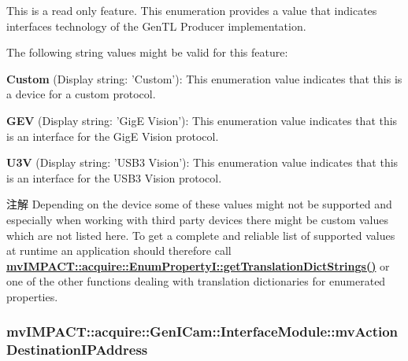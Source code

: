 This is a read only feature. This enumeration provides a value that indicates interfaces technology of the Gen\+T\+L Producer implementation.

The following string values might be valid for this feature\+:
\begin{DoxyItemize}
\item {\bfseries Custom} (Display string\+: 'Custom')\+: This enumeration value indicates that this is a device for a custom protocol.
\item {\bfseries G\+E\+V} (Display string\+: 'Gig\+E Vision')\+: This enumeration value indicates that this is an interface for the Gig\+E Vision protocol.
\item {\bfseries U3\+V} (Display string\+: 'U\+S\+B3 Vision')\+: This enumeration value indicates that this is an interface for the U\+S\+B3 Vision protocol.
\end{DoxyItemize}

\begin{DoxyNote}{注解}
Depending on the device some of these values might not be supported and especially when working with third party devices there might be custom values which are not listed here. To get a complete and reliable list of supported values at runtime an application should therefore call {\bfseries \hyperlink{classmv_i_m_p_a_c_t_1_1acquire_1_1_enum_property_i_a0ba6ccbf5ee69784d5d0b537924d26b6}{mv\+I\+M\+P\+A\+C\+T\+::acquire\+::\+Enum\+Property\+I\+::get\+Translation\+Dict\+Strings()}} or one of the other functions dealing with translation dictionaries for enumerated properties. 
\end{DoxyNote}
\hypertarget{classmv_i_m_p_a_c_t_1_1acquire_1_1_gen_i_cam_1_1_interface_module_a9daa9251711bc8382a96364984776b7b}{
\subsubsection[{mv\+Action\+Destination\+I\+P\+Address}]{ mv\+I\+M\+P\+A\+C\+T\+::acquire\+::\+Gen\+I\+Cam\+::\+Interface\+Module\+::mv\+Action\+Destination\+I\+P\+Address}}\label{classmv_i_m_p_a_c_t_1_1acquire_1_1_gen_i_cam_1_1_interface_module_a9daa9251711bc8382a96364984776b7b}


